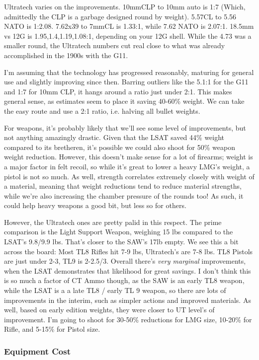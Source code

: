 \begin{multicols*}{2}
	Ultratech varies on the improvements. 10mmCLP to 10mm auto is 1:7 (Which, admittedly the CLP is a garbage designed round by weight). 5.57CL to 5.56 NATO is 1:2.08. 7.62x39 to 7mmCL is 1.33:1, while 7.62 NATO is 2.07:1. 18.5mm vs 12G is 1.95,1.4,1.19,1.08:1, depending on your 12G shell. While the 4.73 was a smaller round, the Ultratech numbers cut real close to what was already accomplished in the 1900s with the G11.
	
	 I'm assuming that the technology has progressed reasonably, maturing for general use and slightly improving since then. Barring outliers like the 5.1:1 for the G11 and 1:7 for 10mm CLP, it hangs around a ratio just under 2:1. This makes general sense, as estimates seem to place it saving 40-60\% weight. We can take the easy route and use a 2:1 ratio, i.e. halving all bullet weights.
	 
	 For weapons, it's probably likely that we'll see some level of improvements, but not anything amazingly drastic. Given that the LSAT saved 44\% weight compared to its bretheren, it's possible we could also shoot for 50\% weapon weight reduction. However, this doesn't make sense for a lot of firearms; weight is a major factor in felt recoil, so while it's great to lower a heavy LMG's weight, a pistol is not so much. As well, strength correlates extremely closely with weight of a material, meaning that weight reductions tend to reduce material strengths, while we're also increasing the chamber pressure of the rounds too! As such, it could help heavy weapons a good bit, but less so for others.
	 
	 However, the Ultratech ones are pretty palid in this respect. The prime comparison is the Light Support Weapon, weighing 15 lbs compared to the LSAT's 9.8/9.9 lbs. That's closer to the SAW's 17lb empty. We see this a bit across the board: Most TL8 Rifles hit 7-9 lbs, Ultratech's are 7-8 lbs. TL8 Pistols are just under 2-3, TL9 is 2-2.5/3. Overall there's \textit{very marginal} improvements, when the LSAT demonstrates that likelihood for great savings. I don't think this is so much a factor of CT Ammo though,  as the SAW is an early TL8 weapon, while the LSAT is a a late TL8 / early TL 9 weapon, so there are lots of improvements in the interim, such as simpler actions and improved materials. As well, based on early edition weights, they were closer to UT level's of improvement.  I'm going to shoot for 30-50\% reductions for LMG size, 10-20\% for Rifle, and 5-15\% for Pistol size.
	 
	 \subsubsection{Equipment Cost}
	 

\end{multicols*}
